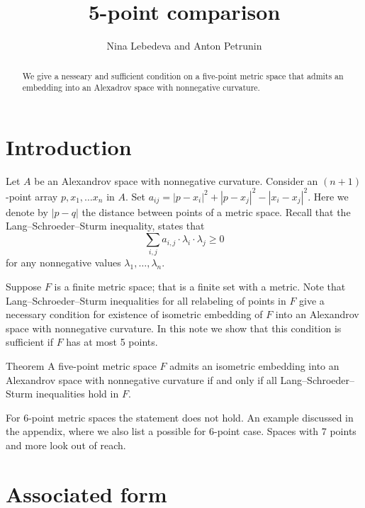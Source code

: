\documentclass{article}
\begin{document}


\title{5-point comparison}
\author{Nina Lebedeva and Anton Petrunin}

\date{}
\maketitle
\begin{abstract}
We give a nesseary and sufficient condition on a five-point metric space that admits an embedding into an Alexadrov space with nonnegative curvature.
\end{abstract}


\section{Introduction}

Let $A$ be an Alexandrov space with nonnegative curvature.
Consider an $(n+1)$-point array $p,x_1,\dots x_n$ in $A$.
Set $a_{ij}=|p-x_i|^2+|p-x_j|^2-|x_i-x_j|^2$.
Here we denote by $|p-q|$ the distance between points of a metric space.
Recall that the Lang--Schroeder--Sturm inequality, states that
\[\sum_{i,j}a_{i,j}\cdot \lambda_i\cdot\lambda_j\ge 0\]
for any nonnegative values $\lambda_1,\dots,\lambda_n$.

Suppose $F$ is a finite metric space; that is a finite set with a metric.
Note that Lang--Schroeder--Sturm inequalities for all relabeling of points in $F$
give a necessary condition for existence of isometric embedding of $F$ into an Alexandrov space with nonnegative curvature.
In this note we show that this condition is sufficient if $F$ has at most 5 points.

\begin{thm}{Theorem}\label{thm:main}
A five-point metric space $F$ admits an isometric embedding into an Alexandrov space with nonnegative curvature
if and only if all Lang--Schroeder--Sturm inequalities hold in $F$.
\end{thm}

For 6-point metric spaces the statement does not hold.
An example discussed in the appendix, where we also list a possible for 6-point case.
Spaces with 7 points and more look out of reach.

\section{Associated form}
\end{document}
